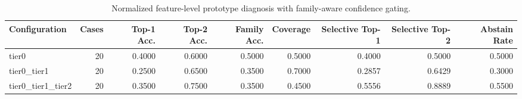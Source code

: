\begin{table}[t]
\centering
\caption{Normalized feature-level prototype diagnosis with family-aware confidence gating.}
\label{tab:dice_stressor_hierarchical_diagnosis}
\footnotesize
\begin{tabular}{lrrrrrrrr}
\toprule
Configuration & Cases & Top-1 Acc. & Top-2 Acc. & Family Acc. & Coverage & Selective Top-1 & Selective Top-2 & Abstain Rate \\
\midrule
tier0 & 20 & 0.4000 & 0.6000 & 0.5000 & 0.5000 & 0.4000 & 0.5000 & 0.5000 \\
tier0_tier1 & 20 & 0.2500 & 0.6500 & 0.3500 & 0.7000 & 0.2857 & 0.6429 & 0.3000 \\
tier0_tier1_tier2 & 20 & 0.3500 & 0.7500 & 0.3500 & 0.4500 & 0.5556 & 0.8889 & 0.5500 \\
\bottomrule
\end{tabular}

\end{table}
